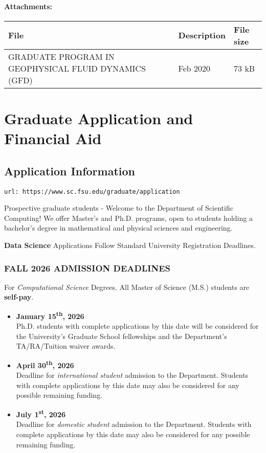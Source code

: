 \documentclass[12pt,a4paper]{article}
\begin{document}
\paragraph{Attachments:}
\begin{center}
\begin{tabular}{ l l l }
\hline
\textbf{File} & \textbf{Description} & \textbf{File size} \\
\hline
GRADUATE PROGRAM IN GEOPHYSICAL FLUID DYNAMICS (GFD) & Feb 2020 & 73 kB \\
\hline
\end{tabular}
\end{center}

\section{Graduate Application and Financial Aid}

\subsection{Application Information}
\texttt{url: https://www.sc.fsu.edu/graduate/application}

Prospective graduate students - Welcome to the Department of Scientific Computing! We offer Master's and Ph.D. programs, open to students holding a bachelor's degree in mathematical and physical sciences and engineering.

\textbf{Data Science} Applications Follow Standard University Registration Deadlines.

\subsubsection*{FALL 2026 ADMISSION DEADLINES}
For \textit{Computational Science} Degrees. All Master of Science (M.S.) students are \textbf{self-pay}.
\begin{itemize}
    \item \textbf{January 15\textsuperscript{th}, 2026} \\ Ph.D. students with complete applications by this date will be considered for the University's Graduate School fellowships and the Department's TA/RA/Tuition waiver awards.
    \item \textbf{April 30\textsuperscript{th}, 2026} \\ Deadline for \textit{international student} admission to the Department. Students with complete applications by this date may also be considered for any possible remaining funding.
    \item \textbf{July 1\textsuperscript{st}, 2026} \\ Deadline for \textit{domestic student} admission to the Department. Students with complete applications by this date may also be considered for any possible remaining funding.
\end{itemize}
\end{document}
